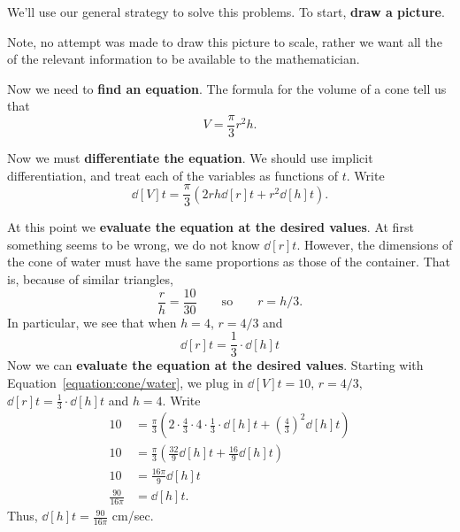 \begin{solution}
We'll use our general strategy to solve this problems. To start,
\textbf{draw a picture}.


Note, no attempt was made to draw this picture to scale, rather we
want all the of the relevant information to be available to the
mathematician.

Now we need to \textbf{find an equation}. The formula for the volume of a cone tell us that 
\[
V = \frac{\pi}{3} r^2 h.
\]

Now we must \textbf{differentiate the equation}. We should use implicit differentiation, and treat each of the variables as functions of $t$. Write
\begin{equation}\label{equation:cone/water}
\dd[V]{t} = \frac{\pi}{3}\left(2rh \dd[r]{t} + r^2 \dd[h]{t}\right).
\end{equation}

At this point we \textbf{evaluate the equation at the desired values}.
At first something seems to be wrong, we do not know $\dd[r]{t}$.
However, the dimensions of the cone of water must have the same
proportions as those of the container.  That is, because of similar
triangles, 
\[
\frac{r}{h}=\frac{10}{30} \qquad\text{so}\qquad r={h/3}.
\]  
In particular, we see that when $h = 4$, $r=4/3$ and 
\[
\dd[r]{t} = \frac{1}{3}\cdot \dd[h]{t}
\]
Now we can \textbf{evaluate the equation at the desired
  values}. Starting with Equation~\ref{equation:cone/water}, we plug
in $\dd[V]{t} = 10$, $r = 4/3$, $\dd[r]{t} = \frac{1}{3}\cdot \dd[h]{t}$
and $h=4$. Write
\begin{align*}
10 &= \frac{\pi}{3}\left(2\cdot \frac{4}{3}\cdot 4 \cdot\frac{1}{3}\cdot\dd[h]{t} + \left(\frac{4}{3}\right)^2 \dd[h]{t}\right)\\
10 &= \frac{\pi}{3}\left(\frac{32}{9}\dd[h]{t} + \frac{16}{9} \dd[h]{t}\right)\\
10 &= \frac{16\pi}{9}\dd[h]{t}\\
\frac{90}{16\pi} &= \dd[h]{t}.
\end{align*}
Thus, $\dd[h]{t}=\frac{90}{16\pi}$ cm/sec.
\end{solution}

